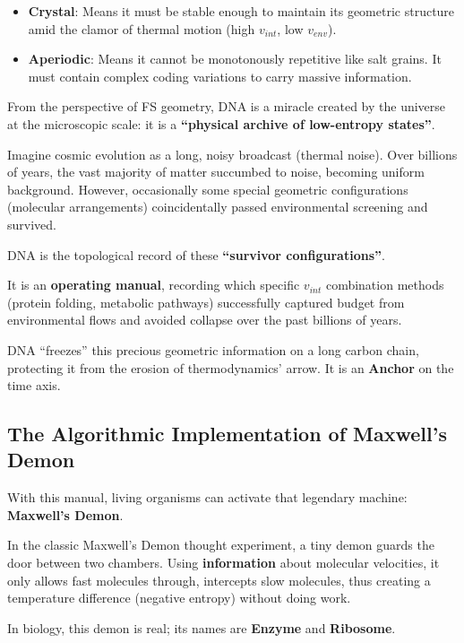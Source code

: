 \begin{itemize}
\item \textbf{Crystal}: Means it must be stable enough to maintain its geometric structure amid the clamor of thermal motion (high $v_{int}$, low $v_{env}$).

\item \textbf{Aperiodic}: Means it cannot be monotonously repetitive like salt grains. It must contain complex coding variations to carry massive information.
\end{itemize}

From the perspective of FS geometry, DNA is a miracle created by the universe at the microscopic scale: it is a \textbf{``physical archive of low-entropy states''}.

Imagine cosmic evolution as a long, noisy broadcast (thermal noise). Over billions of years, the vast majority of matter succumbed to noise, becoming uniform background. However, occasionally some special geometric configurations (molecular arrangements) coincidentally passed environmental screening and survived.

DNA is the topological record of these \textbf{``survivor configurations''}.

It is an \textbf{operating manual}, recording which specific $v_{int}$ combination methods (protein folding, metabolic pathways) successfully captured budget from environmental flows and avoided collapse over the past billions of years.

DNA ``freezes'' this precious geometric information on a long carbon chain, protecting it from the erosion of thermodynamics' arrow. It is an \textbf{Anchor} on the time axis.

\subsection{The Algorithmic Implementation of Maxwell's Demon}

With this manual, living organisms can activate that legendary machine: \textbf{Maxwell's Demon}.

In the classic Maxwell's Demon thought experiment, a tiny demon guards the door between two chambers. Using \textbf{information} about molecular velocities, it only allows fast molecules through, intercepts slow molecules, thus creating a temperature difference (negative entropy) without doing work.

In biology, this demon is real; its names are \textbf{Enzyme} and \textbf{Ribosome}.

